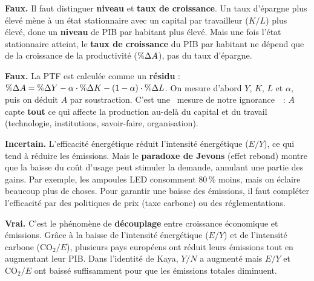 
\begin{reponse}
\textbf{Faux.} Il faut distinguer \textbf{niveau} et \textbf{taux de croissance}. Un taux d'épargne plus élevé mène à un état stationnaire avec un capital par travailleur ($K/L$) plus élevé, donc un \textbf{niveau} de PIB par habitant plus élevé. Mais une fois l'état stationnaire atteint, le \textbf{taux de croissance} du PIB par habitant ne dépend que de la croissance de la productivité ($\%\Delta A$), pas du taux d'épargne.
\end{reponse}


\begin{reponse}
\textbf{Faux.} La PTF est calculée comme un \textbf{résidu} : $\%\Delta A = \%\Delta Y - \alpha \cdot \%\Delta K - (1-\alpha) \cdot \%\Delta L$. On mesure d'abord $Y$, $K$, $L$ et $\alpha$, puis on déduit $A$ par soustraction. C'est une \guillemotleft~mesure de notre ignorance~\guillemotright\ : $A$ capte \textbf{tout} ce qui affecte la production au-delà du capital et du travail (technologie, institutions, savoir-faire, organisation).
\end{reponse}


\begin{reponse}
\textbf{Incertain.} L'efficacité énergétique réduit l'intensité énergétique ($E/Y$), ce qui tend à réduire les émissions. Mais le \textbf{paradoxe de Jevons} (effet rebond) montre que la baisse du coût d'usage peut stimuler la demande, annulant une partie des gains. Par exemple, les ampoules LED consomment 80\,\% moins, mais on éclaire beaucoup plus de choses. Pour garantir une baisse des émissions, il faut compléter l'efficacité par des politiques de prix (taxe carbone) ou des réglementations.
\end{reponse}


\begin{reponse}
\textbf{Vrai.} C'est le phénomène de \textbf{découplage} entre croissance économique et émissions. Grâce à la baisse de l'intensité énergétique ($E/Y$) et de l'intensité carbone ($\text{CO}_2/E$), plusieurs pays européens ont réduit leurs émissions tout en augmentant leur PIB. Dans l'identité de Kaya, $Y/N$ a augmenté mais $E/Y$ et $\text{CO}_2/E$ ont baissé suffisamment pour que les émissions totales diminuent.
\end{reponse}


